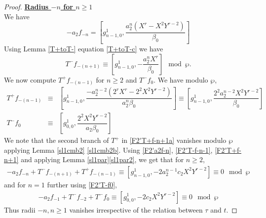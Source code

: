 \documentclass[11pt, reqno]{amsart}
\numberwithin{equation}{section}
\theoremstyle{definition}
\theoremstyle{remark}
\theoremstyle{definition}
\theoremstyle{remark}
\theoremstyle{remark}
\begin{document}
\begin{proof}
\noindent\underline{\textbf{Radius $-n$ for $n\geq 1$}}\\
We have
\begin{equation}\label{F2'a2f-n}
-a_{2}f_{-n}=\left[g_{n-1,0}^{1}, \dfrac{a_{2}^{n}(X^{r}-X^2Y^{r-2})}{\beta_{0}}\right]
\end{equation}
Using Lemma \ref{T+toT-} equation \eqref{T+toT-c} we have
\begin{equation}\label{F2'T-f-n-1}
    T^{-}f_{-(n+1)} \equiv \left[g_{n-1,0}^{1}, -\dfrac{a_{2}^{n}X^{r}}{\beta_{0}}\right]\mod\wp.
\end{equation}
We now compute $T^{+}f_{-(n-1)}$ for $n\geq2$ and $T^{-}f_{0}$. We have modulo $\wp$,
\begin{eqnarray}\label{F2'T+f-n+1}
    T^{+}f_{-(n-1)}&\equiv& \left[g_{n-1,0}^{1}, \dfrac{-a_{2}^{n-2}(2^rX^{r}-2^2X^2Y^{r-2})}{a_{2}^n\beta_{0}}\right] \equiv\left[g_{n-1,0}^{1}, \dfrac{2^2a_{2}^{n-2}X^2Y^{r-2}}{\beta_{0}}\right]\label{F2'T+f-n+1a} \\
    T^{-}f_{0}&\equiv& \left[g_{0,0}^{1}, \dfrac{2^2X^2Y^{r-2}}{a_{2}\beta_{0}}\right] \label{F2'T-f0}
\end{eqnarray}
We note that the second branch of $T^{+}$ in \eqref{F2'T+f-n+1a} vanishes modulo $\wp$ applying Lemma \ref{sl1cmb2} \eqref{sl1cmb2b}. Using \eqref{F2'a2f-n}, \eqref{F2'T-f-n-1}, \eqref{F2'T+f-n+1} and applying Lemma \ref{sl1par}\eqref{sl1par2}, we get that for $n\geq 2$,
\begin{eqnarray*}
-a_{2}f_{-n}+T^{-}f_{-(n+1)}+T^{+}f_{-(n-1)} \equiv \left[g_{n-1,0}^{1}, -2a_{2}^{n-1}c_{2}X^2Y^{r-2} \right] 
\equiv 0 \mod\wp
\end{eqnarray*}
and for $n=1$ further using \eqref{F2'T-f0},\begin{eqnarray*} 
-a_{2}f_{-1}+T^{-}f_{-2}+T^{-}f_{0} \equiv \left[g_{0,0}^{1}, -2c_2X^2Y^{r-2}\right]
\equiv 0 \mod\wp
\end{eqnarray*}
Thus radii $-n, n\geq1$ vanishes irrespective of the relation between $\tau$ and $t$. 


\end{proof}
\end{document}
